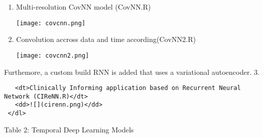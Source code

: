 \documentclass[]{article}
\begin{document}
\begin{enumerate}
\def\labelenumi{\arabic{enumi}.}
\item
  Multi-resolution CovNN model (CovNN.R)

  \texttt{[image: covcnn.png]}
\item
  Convolution accross data and time according(CovNN2.R)

  \texttt{[image: covcnn2.png]}

  \newpage
\end{enumerate}

Furthemore, a custom build RNN is added that uses a variational
autoencoder. 3.

\begin{verbatim}
   <dt>Clinically Informing application based on Recurrent Neural Network (CIReNN.R)</dt>
   <dd>![](cirenn.png)</dd>
 </dl>
\end{verbatim}

Table 2: Temporal Deep Learning Models
\end{document}
